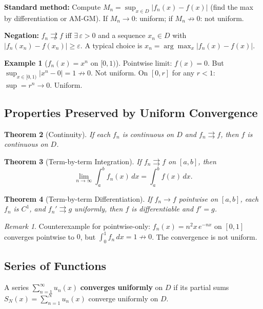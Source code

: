 \documentclass[12pt, a4paper]{article}
\newtheorem{theorem}{Theorem}[section]
\theoremstyle{definition}
\newtheorem{example}[theorem]{Example}
\theoremstyle{remark}
\newtheorem*{remark}{Remark}
\begin{document}
\textbf{Standard method:} Compute $M_n = \sup_{x\in D}|f_n(x)-f(x)|$ (find the max by differentiation or AM-GM). If $M_n \to 0$: uniform; if $M_n \not\to 0$: not uniform.

\textbf{Negation:} $f_n \not\rightrightarrows f$ iff $\exists\,\varepsilon > 0$ and a sequence $x_n \in D$ with $|f_n(x_n) - f(x_n)| \geq \varepsilon$.
A typical choice is $x_n = \arg\max_x |f_n(x) - f(x)|$.

\begin{example}[$f_n(x) = x^n$ on $[0,1)$]
Pointwise limit: $f(x) = 0$. But $\sup_{x\in[0,1)}|x^n - 0| = 1 \not\to 0$. Not uniform.
On $[0,r]$ for any $r < 1$: $\sup = r^n \to 0$. Uniform.
\end{example}

\subsection{Properties Preserved by Uniform Convergence}

\begin{theorem}[Continuity]
If each $f_n$ is continuous on $D$ and $f_n \rightrightarrows f$, then $f$ is continuous on $D$.
\end{theorem}

\begin{theorem}[Term-by-term Integration]
If $f_n \rightrightarrows f$ on $[a,b]$, then
\[
  \lim_{n\to\infty}\int_a^b f_n(x)\,dx = \int_a^b f(x)\,dx.
\]
\end{theorem}

\begin{theorem}[Term-by-term Differentiation]
If $f_n \to f$ pointwise on $[a,b]$, each $f_n$ is $C^1$, and $f_n' \rightrightarrows g$ uniformly, then $f$ is differentiable and $f' = g$.
\end{theorem}

\begin{remark}
Counterexample for pointwise-only: $f_n(x) = n^2 x\,e^{-nx}$ on $[0,1]$ converges pointwise to $0$, but $\int_0^1 f_n\,dx = 1 \not\to 0$. The convergence is not uniform.
\end{remark}

\subsection{Series of Functions}

A series $\displaystyle\sum_{n=1}^\infty u_n(x)$ \textbf{converges uniformly} on $D$ if its partial sums
$S_N(x) = \sum_{n=1}^N u_n(x)$ converge uniformly on $D$.
\end{document}
